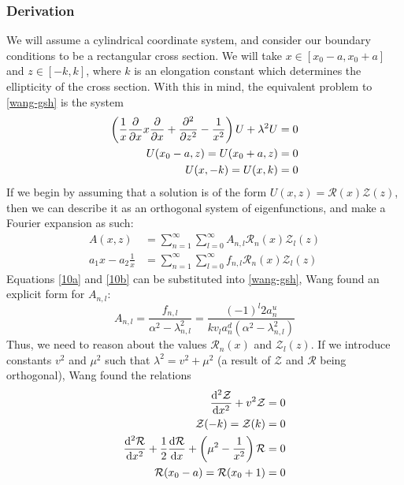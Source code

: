 \subsubsection{Derivation}
We will assume a cylindrical coordinate system, and consider our boundary conditions to be a rectangular cross section. We will 
take $x \in [x_0 - a, x_0 + a]$ and $z \in [-k, k]$, where $k$ is an elongation constant which determines the ellipticity of the cross section. 
With this in mind, the equivalent problem to \ref{wang-gsh} is the system
\begin{align}
    \label{4a} \left ( \frac{1}{x} \pdv{x} x \pdv{x} + \pdv[2]{z} - \frac{1}{x^2} \right ) U + \lambda^2 U &= 0 \\
    \label{4b} U(x_0 - a, z) = U(x_0 + a, z) &= 0 \\
    \label{4c} U(x, -k) = U(x, k) &= 0
\end{align}
If we begin by assuming that a solution is of the form $U(x,z) = \mathcal{R}(x) \mathcal{Z}(z)$, then we can describe it as an 
orthogonal system of eigenfunctions, and make a Fourier expansion as such:
\begin{align}
    \label{10a} A(x,z) &= \sum_{n = 1}^{\infty} \sum_{l = 0}^{\infty} A_{n,l} \mathcal{R}_n(x) \mathcal{Z}_l(z) \\
    \label{10b} a_1 x - a_2 \frac{1}{x} &= \sum_{n = 1}^{\infty} \sum_{l = 0}^{\infty} f_{n,l} \mathcal{R}_n(x) \mathcal{Z}_l(z)
\end{align}
Equations \ref{10a} and \ref{10b} can be substituted into \ref{wang-gsh}, Wang found an explicit form for $A_{n,l}$:
\begin{equation}
    \label{a-form} A_{n,l} = \frac{f_{n,l}}{\alpha^2 - \lambda_{n,l}^2} = \frac{(-1)^l 2a_n^u}{kv_l a_n^d (\alpha^2 - \lambda_{n,l}^2)}
\end{equation}
Thus, we need to reason about the values $\mathcal{R}_n(x)$ and  $\mathcal{Z}_l(z)$. 
If we introduce constants $v^2$ and $\mu^2$ such that $\lambda^2 = v^2 + \mu^2$ (a result of $\mathcal{Z}$ and $\mathcal{R}$ being orthogonal), Wang found the relations
\begin{align}
    \label{5a} \dv[2]{\mathcal{Z}}{x} + v^2 \mathcal{Z} &= 0 \\
    \label{5b} \mathcal{Z}(-k) = \mathcal{Z}(k) &= 0 \\
    \label{5c} \dv[2]{\mathcal{R}}{x} + \frac{1}{2} \dv{\mathcal{R}}{x} + \left ( \mu^2 - \frac{1}{x^2} \right ) \mathcal{R} &= 0 \\
    \label{5d} \mathcal{R}(x_0 - a) = \mathcal{R}(x_0 + 1) &= 0
\end{align}
